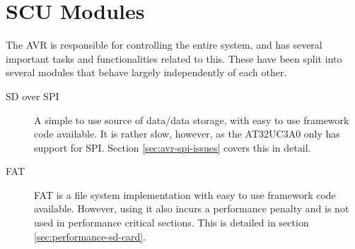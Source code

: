 \section{SCU Modules}
 

The AVR is responsible for controlling the entire system, and has several
important tasks and functionalities related to this. These have been split
into several modules that behave largely independently of each other.
\begin{description}

\item[SD over SPI] A simple to use source of data/data storage, with easy to use
  framework code available. It is rather slow, however, as the AT32UC3A0 only
  has support for SPI. Section \ref{sec:avr-spi-issues} covers this in detail.


\item[FAT] FAT is a file system implementation with easy to use framework
  code available. However, using it also incurs a performance penalty and is not
  used in performance critical sections. This is detailed in section
  \ref{sec:performance-sd-card}.



\end{description}
